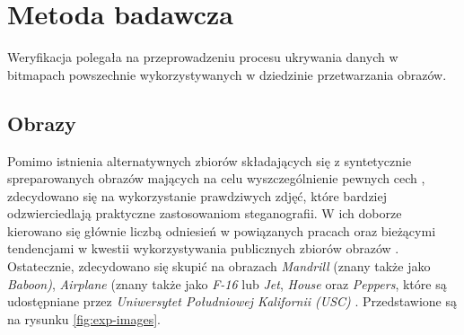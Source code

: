 {    %
    \section{Metoda badawcza}
    {
        Weryfikacja polegała na przeprowadzeniu procesu ukrywania danych w bitmapach powszechnie wykorzystywanych w
        dziedzinie przetwarzania obrazów.

        \subsection{Obrazy}
        {
            Pomimo istnienia alternatywnych zbiorów składających się z syntetycznie spreparowanych obrazów mających na
            celu wyszczególnienie pewnych cech \cite{Uhlmann2018ACI}, zdecydowano się na wykorzystanie prawdziwych
            zdjęć, które bardziej odzwierciedlają praktyczne zastosowaniom steganografii. W ich doborze kierowano się
            głównie liczbą odniesień w powiązanych pracach oraz bieżącymi tendencjami w kwestii wykorzystywania
            publicznych zbiorów obrazów \cite{NoteOnLena1, NoteOnLena2}. Ostatecznie, zdecydowano się skupić na obrazach
            \textit{Mandrill} (znany także jako \textit{Baboon)}, \textit{Airplane} (znany także jako \textit{F-16} lub
            \textit{Jet}, \textit{House} oraz \textit{Peppers}, które są udostępniane przez \textit{Uniwersytet
            Południowej Kalifornii \textnormal{(}USC\textnormal{)}} \cite{USCDatabase}. Przedstawione są na rysunku
            \ref{fig:exp-images}.

            \begin{figure}
                \footnotesize
                \centering
                \hspace{8pt}
                 \\
                \hspace{8pt}


\end{figure}}}}

